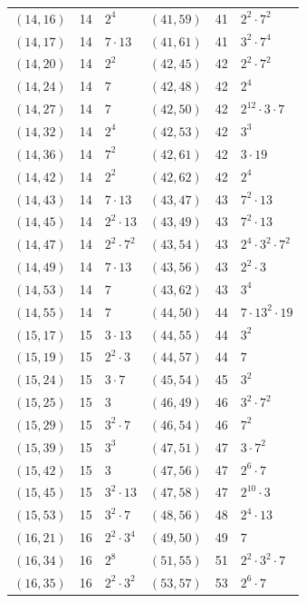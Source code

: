 \documentclass[11pt]{article}
\begin{document}
\begin{longtable}{@{}lrl@{\qquad}lrl@{}}
$(14,16)$ & 14 & $2^{4}$ & $(41,59)$ & 41 & $2^{2}\cdot 7^{2}$\\
$(14,17)$ & 14 & $7\cdot 13$ & $(41,61)$ & 41 & $3^{2}\cdot 7^{4}$\\
$(14,20)$ & 14 & $2^{2}$ & $(42,45)$ & 42 & $2^{2}\cdot 7^{2}$\\
$(14,24)$ & 14 & $7$ & $(42,48)$ & 42 & $2^{4}$\\
$(14,27)$ & 14 & $7$ & $(42,50)$ & 42 & $2^{12}\cdot 3\cdot 7$\\
$(14,32)$ & 14 & $2^{4}$ & $(42,53)$ & 42 & $3^{3}$\\
$(14,36)$ & 14 & $7^{2}$ & $(42,61)$ & 42 & $3\cdot 19$\\
$(14,42)$ & 14 & $2^{2}$ & $(42,62)$ & 42 & $2^{4}$\\
$(14,43)$ & 14 & $7\cdot 13$ & $(43,47)$ & 43 & $7^{2}\cdot 13$\\
$(14,45)$ & 14 & $2^{2}\cdot 13$ & $(43,49)$ & 43 & $7^{2}\cdot 13$\\
$(14,47)$ & 14 & $2^{2}\cdot 7^{2}$ & $(43,54)$ & 43 & $2^{4}\cdot 3^{2}\cdot 7^{2}$\\
$(14,49)$ & 14 & $7\cdot 13$ & $(43,56)$ & 43 & $2^{2}\cdot 3$\\
$(14,53)$ & 14 & $7$ & $(43,62)$ & 43 & $3^{4}$\\
$(14,55)$ & 14 & $7$ & $(44,50)$ & 44 & $7\cdot 13^{2}\cdot 19$\\
$(15,17)$ & 15 & $3\cdot 13$ & $(44,55)$ & 44 & $3^{2}$\\
$(15,19)$ & 15 & $2^{2}\cdot 3$ & $(44,57)$ & 44 & $7$\\
$(15,24)$ & 15 & $3\cdot 7$ & $(45,54)$ & 45 & $3^{2}$\\
$(15,25)$ & 15 & $3$ & $(46,49)$ & 46 & $3^{2}\cdot 7^{2}$\\
$(15,29)$ & 15 & $3^{2}\cdot 7$ & $(46,54)$ & 46 & $7^{2}$\\
$(15,39)$ & 15 & $3^{3}$ & $(47,51)$ & 47 & $3\cdot 7^{2}$\\
$(15,42)$ & 15 & $3$ & $(47,56)$ & 47 & $2^{6}\cdot 7$\\
$(15,45)$ & 15 & $3^{2}\cdot 13$ & $(47,58)$ & 47 & $2^{10}\cdot 3$\\
$(15,53)$ & 15 & $3^{2}\cdot 7$ & $(48,56)$ & 48 & $2^{4}\cdot 13$\\
$(16,21)$ & 16 & $2^{2}\cdot 3^{4}$ & $(49,50)$ & 49 & $7$\\
$(16,34)$ & 16 & $2^{8}$ & $(51,55)$ & 51 & $2^{2}\cdot 3^{2}\cdot 7$\\
$(16,35)$ & 16 & $2^{2}\cdot 3^{2}$ & $(53,57)$ & 53 & $2^{6}\cdot 7$\\

\end{longtable}
\end{document}
